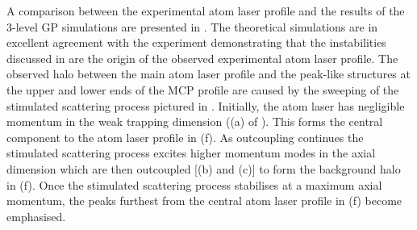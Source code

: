 A comparison between the experimental atom laser profile and the results of the 3-level GP simulations are presented in .  The theoretical simulations are in excellent agreement with the experiment demonstrating that the instabilities discussed in  are the origin of the observed experimental atom laser profile.  The observed halo between the main atom laser profile and the peak-like structures at the upper and lower ends of the MCP profile are caused by the sweeping of the stimulated scattering process pictured in .  Initially, the atom laser has negligible momentum in the weak trapping dimension ((a) of ).  This forms the central component to the atom laser profile in (f).  As outcoupling continues the stimulated scattering process excites higher momentum modes in the axial dimension which are then outcoupled [(b) and (c)] to form the background halo in (f).  Once the stimulated scattering process stabilises at a maximum axial momentum, the peaks furthest from the central atom laser profile in (f) become emphasised.

